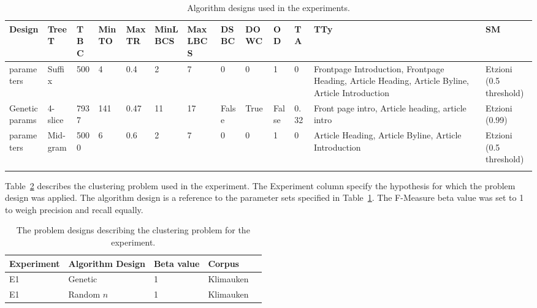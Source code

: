 \begin{landscape}
\begin{center}
\footnotesize
  \begin{longtable}{|p{1.5cm}|p{1.5cm}|p{1cm}|p{1.5cm}|p{1.5cm}|p{1.5cm}|p{1.5cm}|p{1.2cm}|p{1.5cm}|p{0.8cm}|p{1cm}|p{2.5cm}|p{1.5cm}|}
  \hline
  Design & TreeT & TBC & MinTO & MaxTR & MinLBCS & MaxLBCS & DSBC & DOWC & OD & TA & TTy & SM\\
  \hline
  \endhead
  \citeauthor{Oren1998} parameters & Suffix & 500 & 4 & 0.4 & 2 & 7 & 0 & 0 & 1 & 0 & Frontpage Introduction, Frontpage Heading, Article Heading, Article Byline, Article Introduction & Etzioni (0.5 threshold)\\
  \hline
  Genetic params & 4-slice & 7937 & 141 & 0.47 & 11 & 17 & False & True & False & 0.32 & Front page intro, Article heading, article intro & Etzioni (0.99) \\
  \hline
  \citeauthor{Moe2013compact} parameters & Mid-gram & 5000 & 6 & 0.6 & 2 & 7 & 0 & 0 & 1 & 0 & Article Heading, Article Byline, Article Introduction & Etzioni (0.5 threshold)\\
  \hline
    \caption{Algorithm designs used in the experiments.}
	\label{tab:algorithmdesign}
  \end{longtable}
\end{center}
\end{landscape}

Table~\ref{tab:problemdesign} describes the clustering problem used in the experiment. The Experiment column specify the hypothesis for which the problem design was applied. The algorithm design is a reference to the parameter sets specified in Table~\ref{tab:algorithmdesign}. The F-Measure beta value was set to 1 to weigh precision and recall equally.

\begin{table}
\small
\begin{center}
  \begin{tabular}{|l|p{2.5cm}|l|l|l|}
  \hline
  Experiment & Algorithm Design & Beta value & Corpus\\ 
  \hline
  E1 & Genetic & 1 & Klimauken\\
  \hline
  E1 & Random \(n\) & 1 & Klimauken\\
  \hline
  \end{tabular}
\end{center}
\caption{The problem designs describing the clustering problem for the experiment.}
\label{tab:problemdesign}
\end{table}

